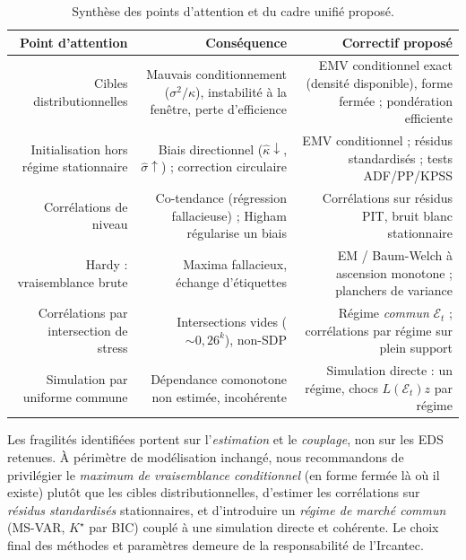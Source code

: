 \documentclass[11pt,a4paper]{article}
\renewcommand{\arraystretch}{1.4}
\newcommand{\tablehead}[1]{\textcolor{nxnavy}{\sffamily\bfseries\small #1}}
\begin{document}
\begin{table}[H]
\centering\small
\renewcommand{\arraystretch}{1.4}\setlength{\tabcolsep}{5pt}
\begin{tabularx}{\linewidth}{R R R}
\toprule
\tablehead{Point d'attention} & \tablehead{Conséquence} & \tablehead{Correctif proposé} \\
\midrule
{} Cibles distributionnelles & Mauvais conditionnement ($\sigma^2/\kappa$), instabilité à la fenêtre, perte d'efficience & EMV conditionnel exact (densité disponible), forme fermée ; pondération efficiente \\
Initialisation hors régime stationnaire & Biais directionnel ($\hat\kappa\!\downarrow$, $\hat\sigma\!\uparrow$) ; correction circulaire & EMV conditionnel ; résidus standardisés ; tests ADF/PP/KPSS \\
 Corrélations de niveau & Co-tendance (régression fallacieuse) ; Higham régularise un biais & Corrélations sur résidus PIT, bruit blanc stationnaire \\
Hardy : vraisemblance brute & Maxima fallacieux, échange d'étiquettes & EM / Baum-Welch à ascension monotone ; planchers de variance \\
 Corrélations par intersection de stress & Intersections vides ($\sim 0{,}26^k$), non-SDP & Régime \emph{commun} $\mathcal{E}_t$ ; corrélations par régime sur plein support \\
Simulation par uniforme commune & Dépendance comonotone non estimée, incohérente & Simulation directe : un régime, chocs $L(\mathcal{E}_t)z$ par régime \\
\bottomrule
\end{tabularx}
\caption{Synthèse des points d'attention et du cadre unifié proposé.}
\end{table}

\begin{auditbox}
Les fragilités identifiées portent sur l'\emph{estimation} et le \emph{couplage}, non sur les EDS retenues. À périmètre de modélisation inchangé, nous recommandons de privilégier le \emph{maximum de vraisemblance conditionnel} (en forme fermée là où il existe) plutôt que les cibles distributionnelles, d'estimer les corrélations sur \emph{résidus standardisés} stationnaires, et d'introduire un \emph{régime de marché commun} (MS-VAR, $K^\star$ par BIC) couplé à une simulation directe et cohérente. Le choix final des méthodes et paramètres demeure de la responsabilité de l'Ircantec.
\end{auditbox}
\end{document}
